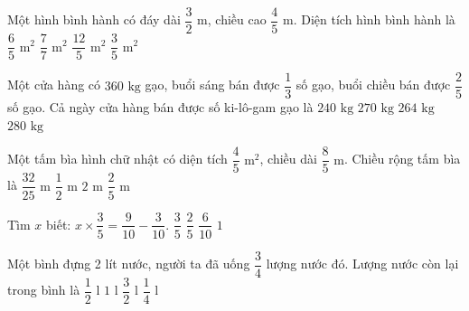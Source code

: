 \begin{ex} %
Một hình bình hành có đáy dài $\dfrac{3}{2}\text{ m}$, chiều cao $\dfrac{4}{5}\text{ m}$. Diện tích hình bình hành là
\choice
{\True $\dfrac{6}{5}\text{ m}^2$}
{$\dfrac{7}{7}\text{ m}^2$}
{$\dfrac{12}{5}\text{ m}^2$}
{$\dfrac{3}{5}\text{ m}^2$}
\end{ex}

\begin{ex} %
Một cửa hàng có $360\text{ kg}$ gạo, buổi sáng bán được $\dfrac{1}{3}$ số gạo, buổi chiều bán được $\dfrac{2}{5}$ số gạo. Cả ngày cửa hàng bán được số ki-lô-gam gạo là
\choice
{$240\text{ kg}$}
{$270\text{ kg}$}
{\True $264\text{ kg}$}
{$280\text{ kg}$}
\end{ex}

\begin{ex} %
Một tấm bìa hình chữ nhật có diện tích $\dfrac{4}{5}\text{ m}^2$, chiều dài $\dfrac{8}{5}\text{ m}$. Chiều rộng tấm bìa là
\choice
{$\dfrac{32}{25}\text{ m}$}
{\True $\dfrac{1}{2}\text{ m}$}
{$2\text{ m}$}
{$\dfrac{2}{5}\text{ m}$}
\end{ex}

\begin{ex} %
Tìm $x$ biết: $x \times \dfrac{3}{5} = \dfrac{9}{10} - \dfrac{3}{10}$.
\choice
{$\dfrac{3}{5}$}
{$\dfrac{2}{5}$}
{$\dfrac{6}{10}$}
{\True $1$}
\end{ex}

\begin{ex} %
Một bình đựng 2 lít nước, người ta đã uống $\dfrac{3}{4}$ lượng nước đó. Lượng nước còn lại trong bình là
\choice
{\True $\dfrac{1}{2}\text{ l}$}
{$1\text{ l}$}
{$\dfrac{3}{2}\text{ l}$}
{$\dfrac{1}{4}\text{ l}$}
\end{ex}

